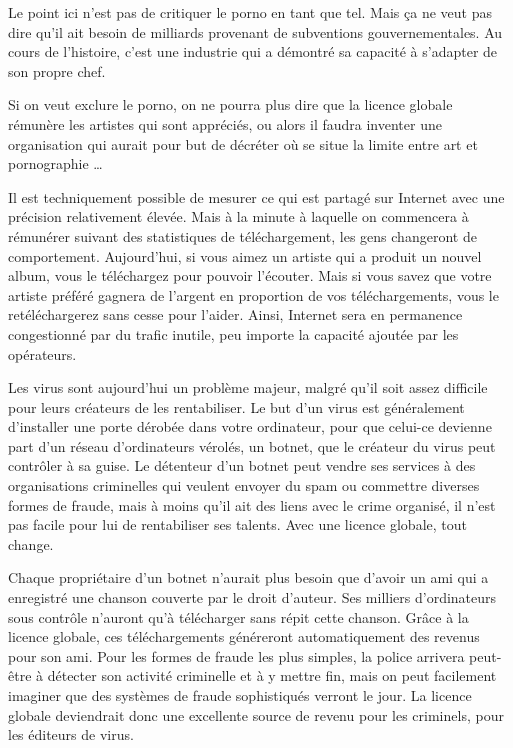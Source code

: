 Le point ici n'est pas de critiquer le porno en tant que tel.
Mais ça ne veut pas dire qu'il ait besoin de milliards provenant de subventions gouvernementales.
Au cours de l'histoire, c'est une industrie qui a démontré sa capacité à s'adapter de son propre chef.

Si on veut exclure le porno, on ne pourra plus dire que la licence globale rémunère les artistes qui sont appréciés, ou alors il faudra inventer une organisation qui aurait pour but de décréter où se situe la limite entre art et pornographie \dots{}

Il est techniquement possible de mesurer ce qui est partagé sur Internet avec une précision relativement élevée.
Mais à la minute à laquelle on commencera à rémunérer suivant des statistiques de téléchargement, les gens changeront de comportement.
Aujourd'hui, si vous aimez un artiste qui a produit un nouvel album, vous le téléchargez pour pouvoir l'écouter.
Mais si vous savez que votre artiste préféré gagnera de l'argent en proportion de vos téléchargements, vous le retéléchargerez sans cesse pour l'aider.
Ainsi, Internet sera en permanence congestionné par du trafic inutile, peu importe la capacité ajoutée par les opérateurs.

Les virus sont aujourd'hui un problème majeur, malgré qu'il soit assez difficile pour leurs créateurs de les rentabiliser.
Le but d'un virus est généralement d'installer une porte dérobée dans votre ordinateur, pour que celui-ce devienne part d'un réseau d'ordinateurs vérolés, un botnet, que le créateur du virus peut contrôler à sa guise.
Le détenteur d'un botnet peut vendre ses services à des organisations criminelles qui veulent envoyer du spam ou commettre diverses formes de fraude, mais à moins qu'il ait des liens avec le crime organisé, il n'est pas facile pour lui de rentabiliser ses talents.
Avec une licence globale, tout change.

Chaque propriétaire d'un botnet n'aurait plus besoin que d'avoir un ami qui a enregistré une chanson couverte par le droit d'auteur.
Ses milliers d'ordinateurs sous contrôle n'auront qu'à télécharger sans répit cette chanson.
Grâce à la licence globale, ces téléchargements généreront automatiquement des revenus pour son ami.
Pour les formes de fraude les plus simples, la police arrivera peut-être à détecter son activité criminelle et à y mettre fin, mais on peut facilement imaginer que des systèmes de fraude sophistiqués verront le jour.
La licence globale deviendrait donc une excellente source de revenu pour les criminels, pour les éditeurs de virus.

